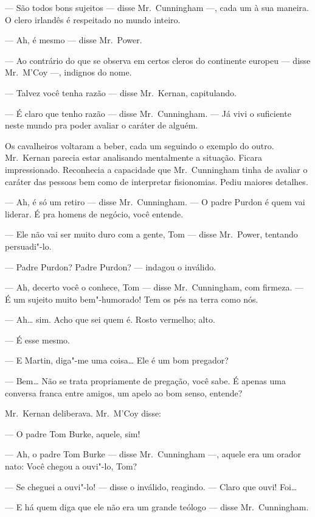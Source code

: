 --- São todos bons sujeitos --- disse Mr.~Cunningham ---, cada um à sua
maneira.  O clero irlandês é respeitado no mundo inteiro.

--- Ah, é mesmo --- disse Mr.~Power.

--- Ao contrário do que se observa em certos cleros do continente europeu ---
disse Mr.~M’Coy ---, indignos do nome.

--- Talvez você tenha razão --- disse Mr.~Kernan, capitulando.

--- É claro que tenho razão --- disse Mr.~Cunningham.  --- Já vivi o suficiente
neste mundo pra poder avaliar o caráter de alguém.

Os cavalheiros voltaram a beber, cada um seguindo o exemplo do outro.  
Mr.~Kernan parecia estar analisando mentalmente a situação.  Ficara impressionado.
Reconhecia a capacidade que Mr.~Cunningham tinha de avaliar o caráter das
pessoas bem como de interpretar fisionomias.  Pediu maiores detalhes.

--- Ah, é só um retiro --- disse Mr.~Cunningham.  --- O padre Purdon é quem vai
liderar.  É pra homens de negócio, você entende.

--- Ele não vai ser muito duro com a gente, Tom --- disse Mr.~Power, tentando
persuadi"-lo.

--- Padre Purdon?  Padre Purdon? --- indagou o inválido.

--- Ah, decerto você o conhece, Tom --- disse Mr.~Cunningham, com firmeza.  ---
É um sujeito muito bem"-humorado!  Tem os pés na terra como nós.

--- Ah\ldots{} sim.  Acho que sei quem é.  Rosto vermelho; alto.

--- É esse mesmo.

--- E Martin, diga"-me uma coisa\ldots{} Ele é um bom pregador?

--- Bem\ldots{} Não se trata propriamente de pregação, você sabe.  É apenas uma
conversa franca entre amigos, um apelo ao bom senso, entende?

Mr.~Kernan deliberava.  Mr.~M’Coy disse:

--- O padre Tom Burke, aquele, sim!

--- Ah, o padre Tom Burke --- disse Mr.~Cunningham ---, aquele era um orador
nato: Você chegou a ouvi"-lo, Tom?

--- Se cheguei a ouvi"-lo! --- disse o inválido, reagindo.  --- Claro que ouvi!
Foi\ldots{}

--- E há quem diga que ele não era um grande teólogo --- disse Mr.~Cunningham.

